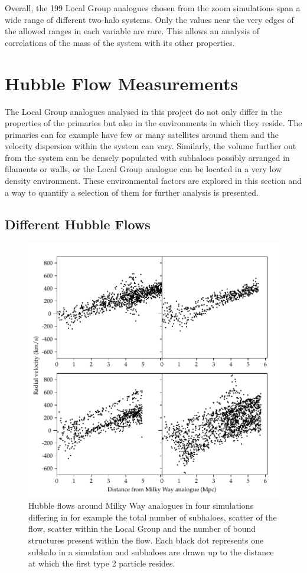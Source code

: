 \documentclass[english, twoside]{HYgradu}
\begin{document}
Overall, the 199 Local Group analogues chosen from the zoom simulations span a wide range of different two-halo systems. Only the values near the very edges of the allowed ranges in each variable are rare. This allows an analysis of correlations of the mass of the system with its other properties.


\section{Hubble Flow Measurements} \label{sect:hf}
The Local Group analogues analysed in this project do not only differ in the properties of the primaries but also in the environments in which they reside. The primaries can for example have few or many satellites around them and the velocity dispersion within the system can vary. Similarly, the volume further out from the system can be densely populated with subhaloes possibly arranged in filaments or walls, or the Local Group analogue can be located in a very low density environment. These environmental factors are explored in this section and a way to quantify a selection of them for further analysis is presented.

\subsection{Different Hubble Flows}

\begin{figure}
    \centering
    \includegraphics{kuvat/hubblediagrams.pdf}
    \caption{Hubble flows around Milky Way analogues in four simulations differing in for example the total number of subhaloes, scatter of the flow, scatter within the Local Group and the number of bound structures present within the flow. Each black dot represents one subhalo in a simulation and subhaloes are drawn up to the distance at which the first type 2 particle resides.}\label{fig:hubblediagrams}
\end{figure}
\end{document}
